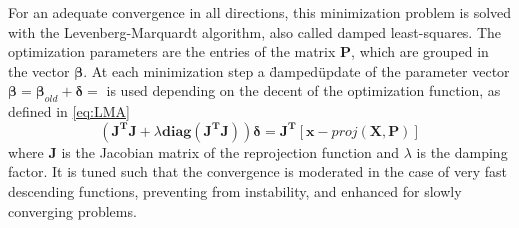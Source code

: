 For an adequate convergence in all directions, this minimization problem is solved with the Levenberg-Marquardt algorithm, also called damped least-squares. The optimization parameters are the entries of the matrix $\mathbf{P}$, which are grouped in the vector $\boldsymbol\beta$. At each minimization step a \"damped\" update of the parameter vector $\boldsymbol\beta=\boldsymbol\beta_{old}+\boldsymbol\delta=$ is used depending on the decent of the optimization function, as defined in \eqref{eq:LMA} \cite{LMA}
\begin{equation}
    (\mathbf{J^T}\mathbf{J} + \lambda \mathbf{diag}(\mathbf{J^T}\mathbf{J}))\boldsymbol\delta = \mathbf{J^T}[\mathbf{x}-proj(\mathbf{X},\mathbf{P})]
\label{eq:LMA}
\end{equation}
where $\mathbf{J}$ is the Jacobian matrix of the reprojection function and $\lambda$ is the damping factor. It is tuned such that
the convergence is moderated in the case of very fast descending functions, preventing from instability, and enhanced for slowly converging problems.

